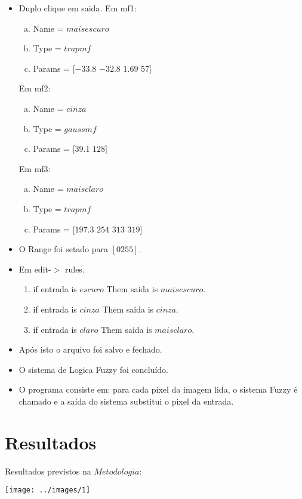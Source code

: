 \documentclass[conference]{IEEEtran}
\begin{document}
\begin{itemize}
	\item Duplo clique em saida. Em mf1: 
		\begin{enumerate}[(a)]
			\item Name = $maisescuro$
			\item Type = $trapmf$
			\item Params = $ [-33.8$ $-32.8$ $1.69$ $57]$
		\end{enumerate}
		Em mf2: 
		\begin{enumerate}[(a)]
			\item Name = $cinza$
			\item Type = $gaussmf$
			\item Params = $ [39.1$ $128]$
		\end{enumerate}
		Em mf3: 
		\begin{enumerate}[(a)]
			\item Name = $maisclaro$
			\item Type = $trapmf$
			\item Params = $ [197.3$ $254$ $313$ $319]$
		\end{enumerate}
	\item O Range foi  setado para  $[0 255]$.
	\item Em edit-$>$ rules. 
		\begin{enumerate}
			\item if entrada is $escuro$ Them saida is $mais escuro$.
			\item if entrada is $cinza$ Them saida is $cinza$.
			\item if entrada is $claro$ Them saida is $mais claro$.
		\end{enumerate}
	\item Ap\'os isto o arquivo foi salvo e fechado.
	\item O sistema de Logica Fuzzy foi conclu\'ido.
	\item O programa consiste em: para cada pixel da imagem lida, o sistema Fuzzy \'e chamado e a sa\'ida do sistema substitui o pixel da entrada.
	
\end{itemize}

\section{Resultados} 
\label{sec:meth} 
Resultados previstos na $Metodologia$:

		\vspace{2\baselineskip}\vspace{-\parskip}
		\begin{minipage}{\linewidth}
  		\centering
  		\texttt{[image: ../images/1]}
		\end{minipage}
		
\end{document}
